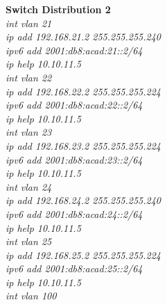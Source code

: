 \documentclass[a4paper, 12pt]{article}
\begin{document}
\hspace*{1cm}\textbf{Switch Distribution 2}\\
\hspace*{2cm}\textit{int vlan 21\\
\hspace*{2cm}ip add 192.168.21.2 255.255.255.240\\
\hspace*{2cm}ipv6 add 2001:db8:acad:21::2/64\\
\hspace*{2cm}ip help 10.10.11.5\\
\hspace*{2cm}int vlan 22\\
\hspace*{2cm}ip add 192.168.22.2 255.255.255.224\\
\hspace*{2cm}ipv6 add 2001:db8:acad:22::2/64\\
\hspace*{2cm}ip help 10.10.11.5\\
\hspace*{2cm}int vlan 23\\
\hspace*{2cm}ip add 192.168.23.2 255.255.255.224\\
\hspace*{2cm}ipv6 add 2001:db8:acad:23::2/64\\
\hspace*{2cm}ip help 10.10.11.5\\
\hspace*{2cm}int vlan 24\\
\hspace*{2cm}ip add 192.168.24.2 255.255.255.240\\
\hspace*{2cm}ipv6 add 2001:db8:acad:24::2/64\\
\hspace*{2cm}ip help 10.10.11.5\\
\hspace*{2cm}int vlan 25\\
\hspace*{2cm}ip add 192.168.25.2 255.255.255.224\\
\hspace*{2cm}ipv6 add 2001:db8:acad:25::2/64\\
\hspace*{2cm}ip help 10.10.11.5\\
\hspace*{2cm}int vlan 100\\
}
\end{document}
